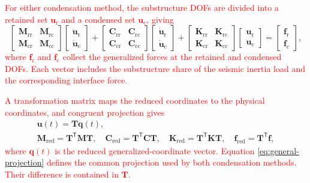 \documentclass[11pt,a4paper]{article}
\numberwithin{equation}{section}
\newcommand{\rev}[1]{\textcolor{red}{#1}}
\begin{document}
\rev{For either condensation method, the substructure DOFs are divided into a retained set \(\bm{u}_{\mathrm{r}}\) and a condensed set \(\bm{u}_{\mathrm{c}}\), giving}
\begin{equation}
	\begin{bmatrix}
		\mathbf{M}_{\mathrm{rr}} & \mathbf{M}_{\mathrm{rc}}\\
		\mathbf{M}_{\mathrm{cr}} & \mathbf{M}_{\mathrm{cc}}
	\end{bmatrix}
	\begin{bmatrix}
		\ddot{\bm{u}}_{\mathrm{r}}\\
		\ddot{\bm{u}}_{\mathrm{c}}
	\end{bmatrix}
	+
	\begin{bmatrix}
		\mathbf{C}_{\mathrm{rr}} & \mathbf{C}_{\mathrm{rc}}\\
		\mathbf{C}_{\mathrm{cr}} & \mathbf{C}_{\mathrm{cc}}
	\end{bmatrix}
	\begin{bmatrix}
		\dot{\bm{u}}_{\mathrm{r}}\\
		\dot{\bm{u}}_{\mathrm{c}}
	\end{bmatrix}
	+
	\begin{bmatrix}
		\mathbf{K}_{\mathrm{rr}} & \mathbf{K}_{\mathrm{rc}}\\
		\mathbf{K}_{\mathrm{cr}} & \mathbf{K}_{\mathrm{cc}}
	\end{bmatrix}
	\begin{bmatrix}
		\bm{u}_{\mathrm{r}}\\
		\bm{u}_{\mathrm{c}}
	\end{bmatrix}
	=
	\begin{bmatrix}
		\bm{f}_{\mathrm{r}}\\
		\bm{f}_{\mathrm{c}}
	\end{bmatrix},
	\label{eq:partitioned-local-eom}
\end{equation}
\rev{where \(\bm{f}_{\mathrm{r}}\) and \(\bm{f}_{\mathrm{c}}\) collect the generalized forces at the retained and condensed DOFs. Each vector includes the substructure share of the seismic inertia load and the corresponding interface force.}

\rev{A transformation matrix maps the reduced coordinates to the physical coordinates, and congruent projection gives}
\begin{equation}
	\begin{gathered}
		\bm{u}(t)=\mathbf{T}\bm{q}(t),\\
		\mathbf{M}_{\mathrm{red}}=\mathbf{T}^{\mathsf{T}}\mathbf{M}\mathbf{T},\quad
		\mathbf{C}_{\mathrm{red}}=\mathbf{T}^{\mathsf{T}}\mathbf{C}\mathbf{T},\quad
		\mathbf{K}_{\mathrm{red}}=\mathbf{T}^{\mathsf{T}}\mathbf{K}\mathbf{T},\quad
		\bm{f}_{\mathrm{red}}=\mathbf{T}^{\mathsf{T}}\bm{f},
	\end{gathered}
	\label{eq:general-projection}
\end{equation}
\rev{where \(\bm{q}(t)\) is the reduced generalized-coordinate vector. Equation \eqref{eq:general-projection} defines the common projection used by both condensation methods. Their difference is contained in \(\mathbf{T}\).}
\end{document}
